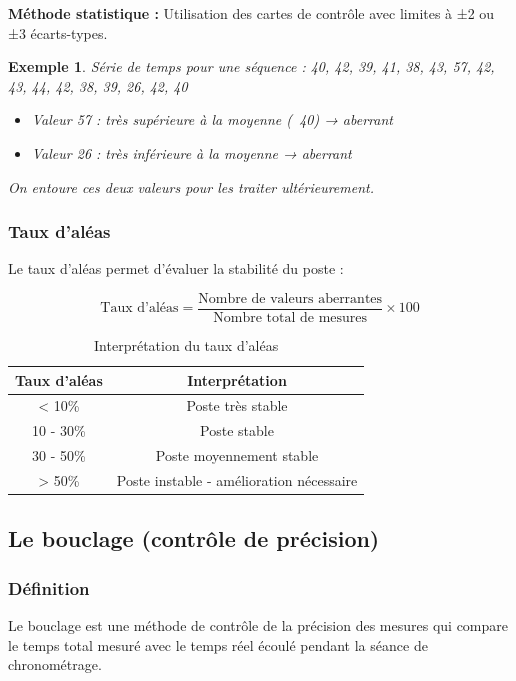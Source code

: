 \documentclass[a4paper,12pt]{article}
\newtheorem{exemple}{Exemple}[section]
\begin{document}
\textbf{Méthode statistique :} Utilisation des cartes de contrôle avec limites à ±2 ou ±3 écarts-types.

\begin{exemple}
Série de temps pour une séquence : 40, 42, 39, 41, 38, 43, 57, 42, 43, 44, 42, 38, 39, 26, 42, 40

\begin{itemize}
    \item Valeur 57 : très supérieure à la moyenne (~40) → aberrant
    \item Valeur 26 : très inférieure à la moyenne → aberrant
\end{itemize}
On entoure ces deux valeurs pour les traiter ultérieurement.
\end{exemple}

\subsubsection{Taux d'aléas}

Le taux d'aléas permet d'évaluer la stabilité du poste :

\[
\text{Taux d'aléas} = \frac{\text{Nombre de valeurs aberrantes}}{\text{Nombre total de mesures}} \times 100
\]

\begin{table}[ht]
\centering
\begin{tabular}{|c|c|}
\hline
\textbf{Taux d'aléas} & \textbf{Interprétation} \\
\hline
< 10\% & Poste très stable \\
10 - 30\% & Poste stable \\
30 - 50\% & Poste moyennement stable \\
> 50\% & Poste instable - amélioration nécessaire \\
\hline
\end{tabular}
\caption{Interprétation du taux d'aléas}
\end{table}

\subsection{Le bouclage (contrôle de précision)}

\subsubsection{Définition}

Le bouclage est une méthode de contrôle de la précision des mesures qui compare le temps total mesuré avec le temps réel écoulé pendant la séance de chronométrage.
\end{document}
